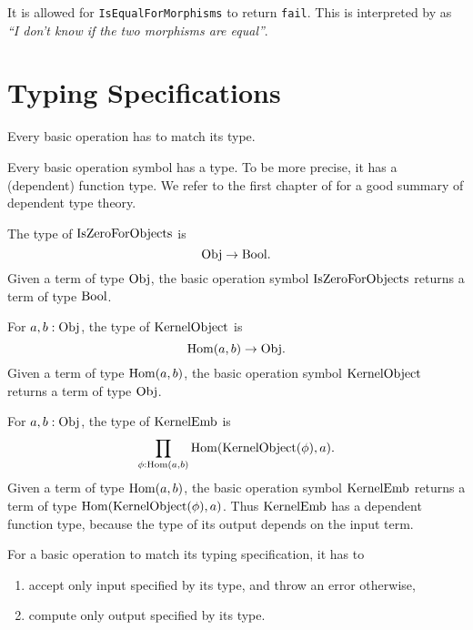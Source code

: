 \begin{remark}
 It is allowed for \texttt{IsEqualForMorphisms} to return \texttt{fail}. This is interpreted by \CapPkg as
 \textit{``I don't know if the two morphisms are equal''}.
\end{remark}


\section{Typing Specifications}

\begin{specification}
 Every basic operation has to match its type.
\end{specification}

Every basic operation symbol has a type. To be more precise, it has a (dependent) function type.
We refer to the first chapter of \cite{hottbook} for a good summary of dependent type theory.

\begin{example}\label{example:simple_typing}
 The type of $\mathrm{IsZeroForObjects}$ is
 \[
  \mathrm{Obj} \rightarrow \mathrm{Bool}.
 \]
 Given a term of type $\mathrm{Obj}$, the basic operation symbol $\mathrm{IsZeroForObjects}$ returns a term of type $\mathrm{Bool}$.
\end{example}

\begin{example}\label{example:simple_typing_with_morphism_input}
 For $a,b: \mathrm{Obj}$, the type of $\mathrm{KernelObject}$ is
 \[
  \operatorname{\mathrm{Hom}}(a,b) \rightarrow \mathrm{Obj}.
 \]
 Given a term of type $\operatorname{\mathrm{Hom}}(a,b)$, the basic operation symbol $\mathrm{KernelObject}$ returns a term of type $\mathrm{Obj}$.
\end{example}

\begin{example}\label{example:dependent_typing}
 For $a,b: \mathrm{Obj}$, the type of $\mathrm{KernelEmb}$ is
 \[
  \prod_{\phi: \operatorname{\mathrm{Hom}}(a,b)} \operatorname{\mathrm{Hom}}( \mathrm{KernelObject}(\phi), a ).
 \]
 Given a term of type $\operatorname{\mathrm{Hom}}(a,b)$, the basic operation symbol $\mathrm{KernelEmb}$ returns a term of type $\operatorname{\mathrm{Hom}}( \mathrm{KernelObject}(\phi), a )$.
 Thus $\mathrm{KernelEmb}$ has a dependent function type, because the type of its output depends on the input term.
\end{example}

For a basic operation to match its typing specification, it has to
\begin{enumerate}
 \item accept only input specified by its type, and throw an error otherwise,
 \item compute only output specified by its type.
\end{enumerate}

